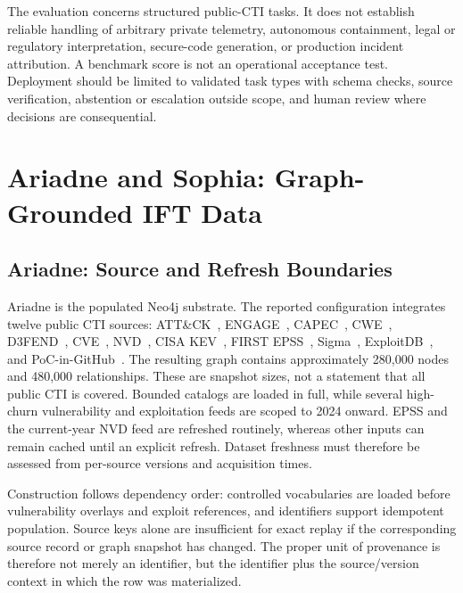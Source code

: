 \documentclass[conference]{IEEEtran}
\begin{document}
The evaluation concerns structured public-CTI tasks. It does not establish reliable handling of arbitrary private telemetry, autonomous containment, legal or regulatory interpretation, secure-code generation, or production incident attribution. A benchmark score is not an operational acceptance test. Deployment should be limited to validated task types with schema checks, source verification, abstention or escalation outside scope, and human review where decisions are consequential.

\section{Ariadne and Sophia: Graph-Grounded IFT Data}
\subsection{Ariadne: Source and Refresh Boundaries}
Ariadne is the populated Neo4j substrate. The reported configuration integrates twelve public CTI sources: ATT\&CK~\cite{strom2018attack}, ENGAGE~\cite{mitreengage}, CAPEC~\cite{capec}, CWE~\cite{cwe}, D3FEND~\cite{d3fend}, CVE~\cite{cve}, NVD~\cite{nvd}, CISA KEV~\cite{cisakev}, FIRST EPSS~\cite{jacobs2021epss}, Sigma~\cite{sigma}, ExploitDB~\cite{exploitdb}, and PoC-in-GitHub~\cite{pocingithub}. The resulting graph contains approximately 280,000 nodes and 480,000 relationships. These are snapshot sizes, not a statement that all public CTI is covered. Bounded catalogs are loaded in full, while several high-churn vulnerability and exploitation feeds are scoped to 2024 onward. EPSS and the current-year NVD feed are refreshed routinely, whereas other inputs can remain cached until an explicit refresh. Dataset freshness must therefore be assessed from per-source versions and acquisition times.

Construction follows dependency order: controlled vocabularies are loaded before vulnerability overlays and exploit references, and identifiers support idempotent population. Source keys alone are insufficient for exact replay if the corresponding source record or graph snapshot has changed. The proper unit of provenance is therefore not merely an identifier, but the identifier plus the source/version context in which the row was materialized.
\end{document}

